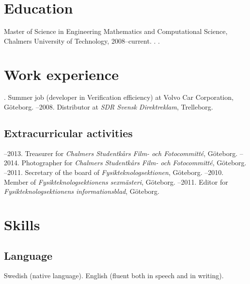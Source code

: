 \documentclass{skvitae}
\author{Simon Sigurdhsson}
\affiliation{}
\begin{document}
	\RaggedRight
	\maketitle


	\section{Education}
	\ind Master of Science in Engineering Mathematics and Computational Science, Chalmers University of Technology, 2008--current.%
	.%
	.

	\section{Work experience}
	. Summer job (developer in Verification efficiency) at Volvo Car Corporation, Göteborg.
	--2008. Distributor at \emph{SDR Svensk Direktreklam}, Trelleborg.

	\medskip
	\subsection{Extracurricular activities}
	--2013. Treasurer for \emph{Chalmers Studentkårs Film- och Fotocommitté}, Göteborg.
	--2014. Photographer for \emph{Chalmers Studentkårs Film- och Fotocommitté}, Göteborg.
	--2011. Secretary of the board of \emph{Fysikteknologsektionen}, Göteborg.
	--2010. Member of \emph{Fysikteknologsektionens sexmästeri}, Göteborg.
	--2011. Editor for \emph{Fysikteknologsektionens informationsblad}, Göteborg.

	\section{Skills}
	\subsection{Language}
	\ind Swedish (native language).
	\ind English (fluent both in speech and in writing).
\end{document}
